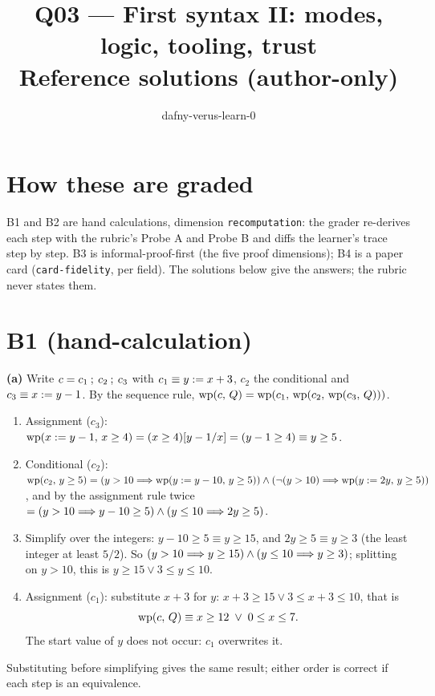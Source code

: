\documentclass[11pt]{article}
\title{Q03 --- First syntax II: modes, logic, tooling, trust \\ \large Reference solutions (author-only)}
\author{dafny-verus-learn-0}
\date{}
\begin{document}
\maketitle

\section*{How these are graded}
B1 and B2 are hand calculations, dimension \texttt{recomputation}: the grader
re-derives each step with the rubric's Probe A and Probe B and diffs the
learner's trace step by step. B3 is informal-proof-first (the five proof
dimensions); B4 is a paper card (\texttt{card-fidelity}, per field). The
solutions below give the answers; the rubric never states them.

\section*{B1 (hand-calculation)}

\textbf{(a)} Write $c = c_1 \seqc c_2 \seqc c_3$ with $c_1 \equiv y \assign x + 3$,
$c_2$ the conditional and $c_3 \equiv x \assign y - 1$. By the sequence rule,
$\WP{c}{Q} = \WP{c_1}{\WP{c_2}{\WP{c_3}{Q}}}$.
\begin{enumerate}
\item Assignment ($c_3$): $\WP{x \assign y - 1}{x \geq 4} = \subst{(x \geq 4)}{x}{y-1}
  = (y - 1 \geq 4) \equiv y \geq 5$.
\item Conditional ($c_2$):
  $\WP{c_2}{y \geq 5} = (y > 10 \impl \WP{y \assign y - 10}{y \geq 5}) \wedge
  (\neg(y > 10) \impl \WP{y \assign 2y}{y \geq 5})$, and by the assignment rule
  twice $= (y > 10 \impl y - 10 \geq 5) \wedge (y \leq 10 \impl 2y \geq 5)$.
\item Simplify over the integers: $y - 10 \geq 5 \equiv y \geq 15$, and
  $2y \geq 5 \equiv y \geq 3$ (the least integer at least $5/2$). So
  $(y > 10 \impl y \geq 15) \wedge (y \leq 10 \impl y \geq 3)$; splitting on
  $y > 10$, this is $y \geq 15 \vee 3 \leq y \leq 10$.
\item Assignment ($c_1$): substitute $x + 3$ for $y$:
  $x + 3 \geq 15 \vee 3 \leq x + 3 \leq 10$, that is
  \[ \WP{c}{Q} \equiv x \geq 12 \;\vee\; 0 \leq x \leq 7. \]
  The start value of $y$ does not occur: $c_1$ overwrites it.
\end{enumerate}
Substituting before simplifying gives the same result; either order is
correct if each step is an equivalence.
\end{document}
